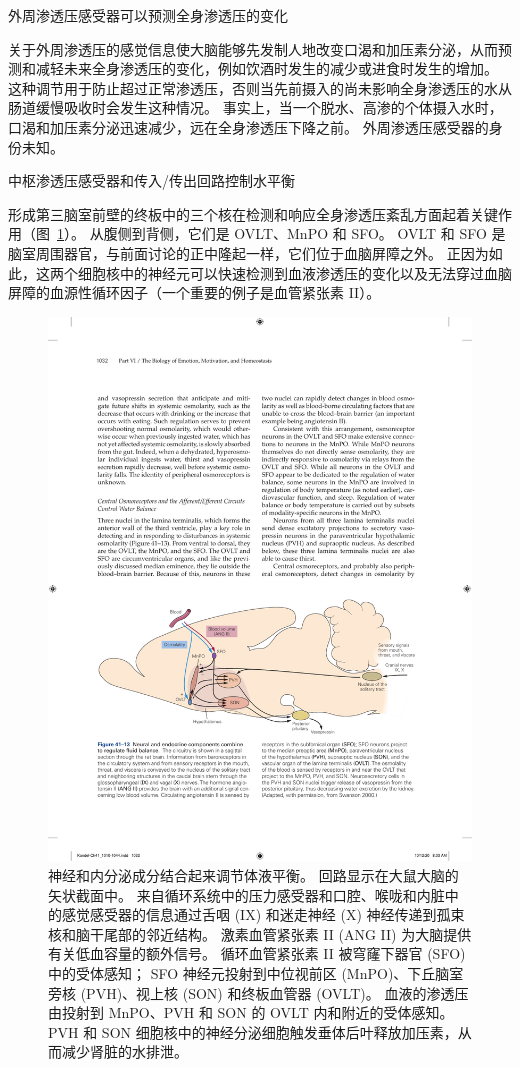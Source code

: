 外周渗透压感受器可以预测全身渗透压的变化

关于外周渗透压的感觉信息使大脑能够先发制人地改变口渴和加压素分泌，从而预测和减轻未来全身渗透压的变化，例如饮酒时发生的减少或进食时发生的增加。
这种调节用于防止超过正常渗透压，否则当先前摄入的尚未影响全身渗透压的水从肠道缓慢吸收时会发生这种情况。
事实上，当一个脱水、高渗的个体摄入水时，口渴和加压素分泌迅速减少，远在全身渗透压下降之前。
外周渗透压感受器的身份未知。


中枢渗透压感受器和传入/传出回路控制水平衡

形成第三脑室前壁的终板中的三个核在检测和响应全身渗透压紊乱方面起着关键作用（图~\ref{fig:41_13}）。
从腹侧到背侧，它们是 OVLT、MnPO 和 SFO。 OVLT 和 SFO 是脑室周围器官，与前面讨论的正中隆起一样，它们位于血脑屏障之外。
正因为如此，这两个细胞核中的神经元可以快速检测到血液渗透压的变化以及无法穿过血脑屏障的血源性循环因子（一个重要的例子是血管紧张素 II）。


\begin{figure}[htbp]
	\centering
	\includegraphics[width=0.95\linewidth]{chap41/fig_41_13}
	\caption{神经和内分泌成分结合起来调节体液平衡。
		回路显示在大鼠大脑的矢状截面中。
		来自循环系统中的压力感受器和口腔、喉咙和内脏中的感觉感受器的信息通过舌咽 (IX) 和迷走神经 (X) 神经传递到孤束核和脑干尾部的邻近结构。
		激素血管紧张素 II (ANG II) 为大脑提供有关低血容量的额外信号。
		循环血管紧张素 II 被穹窿下器官 (SFO) 中的受体感知； 
		SFO 神经元投射到中位视前区 (MnPO)、下丘脑室旁核 (PVH)、视上核 (SON) 和终板血管器 (OVLT)。
		血液的渗透压由投射到 MnPO、PVH 和 SON 的 OVLT 内和附近的受体感知。
		PVH 和 SON 细胞核中的神经分泌细胞触发垂体后叶释放加压素，从而减少肾脏的水排泄\cite{swanson2000cerebral}。}
	\label{fig:41_13}
\end{figure}


